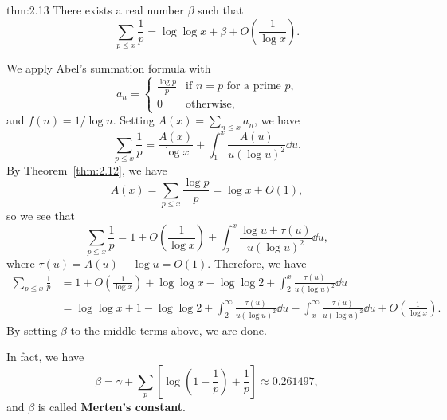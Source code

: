 \begin{theo}[Merten]{thm:2.13}
There exists a real number $\beta$ such that 
\[ \sum_{p \leq x} \frac1p = \log\log x + \beta + O\left(\frac1{\log x}\right). \]
\end{theo}
\begin{pf}
We apply Abel's summation formula with 
\[ a_n = \begin{cases} \frac{\log p}p & \text{if $n = p$ for a prime $p$,} \\ 0 & \text{otherwise,} \end{cases} \]
and $f(n) = 1/\log n$. Setting $A(x) = \sum_{n\leq x} a_n$, we have 
\[ \sum_{p \leq x} \frac1p = \frac{A(x)}{\log x} + 
\int_1^x \frac{A(u)}{u(\log u)^2}\dd u. \]
By Theorem~\ref{thm:2.12}, we have 
\[ A(x) = \sum_{p\leq x} \frac{\log p}p = \log x + O(1), \]
so we see that 
\[ \sum_{p\leq x} \frac1p = 1 + O\left(\frac1{\log x}\right)
+ \int_2^x \frac{\log u + \tau(u)}{u(\log u)^2}\dd u, \]
where $\tau(u) = A(u) - \log u = O(1)$. Therefore, we have 
\begin{align*}
    \sum_{p\leq x} \frac1p 
    &= 1 + O\left( \frac1{\log x} \right) + \log\log x 
    - \log\log 2 + \int_2^x \frac{\tau(u)}{u(\log u)^2}\dd u \\
    &= \log\log x + 1 - \log\log 2 + \int_2^\infty 
    \frac{\tau(u)}{u(\log u)^2}\dd u - 
    \int_x^\infty \frac{\tau(u)}{u(\log u)^2}\dd u + 
    O \left( \frac1{\log x} \right). 
\end{align*}
By setting $\beta$ to the middle terms above, we are done.
\end{pf}

In fact, we have 
\[ \beta = \gamma + \sum_p \left[ \log \left( 1 - \frac1p \right) + \frac1p \right] \approx 0.261497, \]
and $\beta$ is called {\bf Merten's constant}.